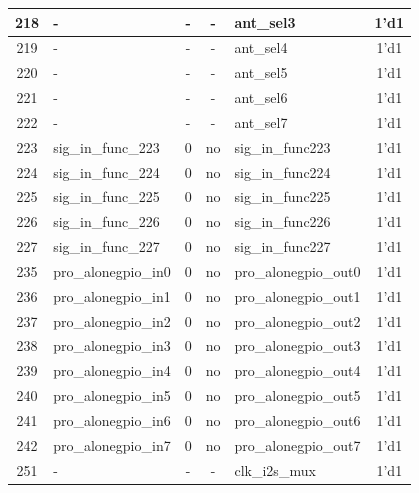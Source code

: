 \begin{longtable}[c]{|c|l|c|c|l|c|}
218  &                        -  &  -  &    -  &               ant\_sel3  &               1'd1  \\\hline
219  &                        -  &  -  &    -  &               ant\_sel4  &               1'd1  \\\hline
220  &                        -  &  -  &    -  &               ant\_sel5  &               1'd1  \\\hline
221  &                        -  &  -  &    -  &               ant\_sel6  &               1'd1  \\\hline
222  &                        -  &  -  &    -  &               ant\_sel7  &               1'd1  \\\hline
223  &       sig\_in\_func\_223  &  0  &   no  &        sig\_in\_func223  &               1'd1  \\\hline
224  &       sig\_in\_func\_224  &  0  &   no  &        sig\_in\_func224  &               1'd1  \\\hline
225  &       sig\_in\_func\_225  &  0  &   no  &        sig\_in\_func225  &               1'd1  \\\hline
226  &       sig\_in\_func\_226  &  0  &   no  &        sig\_in\_func226  &               1'd1  \\\hline
227  &       sig\_in\_func\_227  &  0  &   no  &        sig\_in\_func227  &               1'd1  \\\hline
235  &      pro\_alonegpio\_in0  &  0  &   no  &    pro\_alonegpio\_out0  &               1'd1  \\\hline
236  &      pro\_alonegpio\_in1  &  0  &   no  &    pro\_alonegpio\_out1  &               1'd1  \\\hline
237  &      pro\_alonegpio\_in2  &  0  &   no  &    pro\_alonegpio\_out2  &               1'd1  \\\hline
238  &      pro\_alonegpio\_in3  &  0  &   no  &    pro\_alonegpio\_out3  &               1'd1  \\\hline
239  &      pro\_alonegpio\_in4  &  0  &   no  &    pro\_alonegpio\_out4  &               1'd1  \\\hline
240  &      pro\_alonegpio\_in5  &  0  &   no  &    pro\_alonegpio\_out5  &               1'd1  \\\hline
241  &      pro\_alonegpio\_in6  &  0  &   no  &    pro\_alonegpio\_out6  &               1'd1  \\\hline
242  &      pro\_alonegpio\_in7  &  0  &   no  &    pro\_alonegpio\_out7  &               1'd1  \\\hline
251  &                        -  &  -  &    -  &           clk\_i2s\_mux  &               1'd1  \\\hline
\end{longtable}
